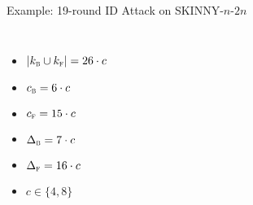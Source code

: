 \documentclass[table,aspectratio=169]{beamer}
\newcommand{\In}{_{\textsc{b}}} %
\newcommand{\Out}{_{\textsc{f}}} %
\newcommand{\cs}{c} %
\begin{document}
\begin{frame}{Example: 19-round ID Attack on SKINNY-$n$-$2n$}
\vspace{-0.6cm}
\begin{columns}
\begin{itemize}
  \small
  \item $|k\In \cup k\Out| = 26\cdot \cs$
  \item $c\In = 6\cdot \cs$
  \item $c\Out = 15\cdot \cs$
  \item $\Delta\In = 7\cdot \cs$
  \item $\Delta\Out = 16\cdot \cs$
  \item $\cs \in \{4, 8\}$
\end{itemize}
\begin{figure}
\centering
\resizebox{0.95\textwidth}{!}{
\begin{tikzpicture}

\SkinnyInit{}{}{}{} %


\end{tikzpicture}}
\end{figure}
\end{columns}
\end{frame}
\end{document}
